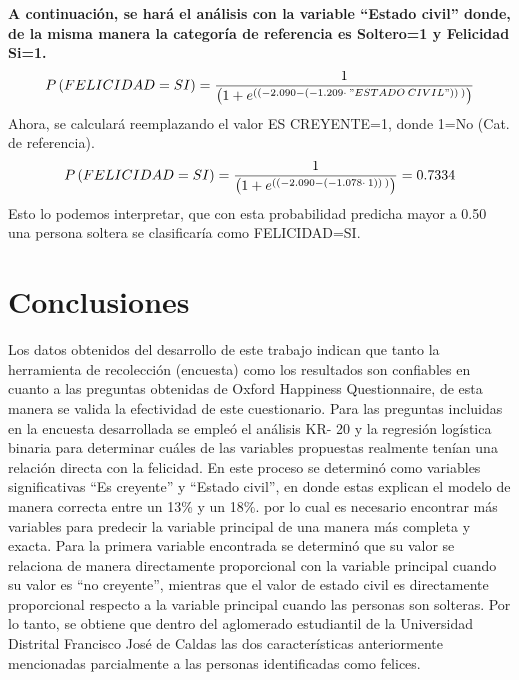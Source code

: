 \documentclass[conference]{IEEEtran}
\begin{document}
\textbf{A continuación, se hará el análisis con la variable “Estado civil” donde, de la misma manera la categoría de referencia es Soltero=1 y Felicidad Si=1.}\\   
\begin{equation}\tiny
P\left(FELICIDAD=SI\right)=\frac{1}{\left(1+e^{\left(\left(-2.090-\left(-1.209\cdot \:"ESTADO\:CIVIL"\right)\right)\:\right)}\right)}
\end{equation}
   Ahora, se calculará reemplazando el valor ES CREYENTE=1, donde 1=No (Cat. de referencia). \\
   \begin{equation}\tiny
 P\left(FELICIDAD=SI\right)=\frac{1}{\left(1+e^{\left(\left(-2.090-\left(-1.078\cdot \:1\right)\right)\:\right)}\right)}=0.7334
 \end{equation}
 Esto lo podemos interpretar, que con esta probabilidad predicha mayor a 0.50 una persona soltera se clasificaría como FELICIDAD=SI.\\
\section{Conclusiones}
  
  Los datos obtenidos del desarrollo de este trabajo   indican que tanto la herramienta de recolección (encuesta) como los resultados son confiables en cuanto a las preguntas obtenidas de Oxford Happiness Questionnaire, de esta manera se valida la efectividad de este cuestionario. Para las preguntas incluidas en la encuesta desarrollada se empleó el análisis KR- 20 y la regresión logística binaria para determinar cuáles de las variables propuestas realmente tenían una relación directa con la felicidad. En este proceso se determinó como variables significativas “Es creyente” y “Estado civil”, en donde estas explican el modelo de manera correcta entre un 13\% y un 18\%. por lo cual es necesario encontrar más variables para predecir la variable principal de una manera más completa y exacta. Para la primera variable encontrada se determinó que su valor se relaciona de manera directamente proporcional con la variable principal cuando su valor es “no creyente”, mientras que el valor de estado civil es directamente proporcional respecto a la variable principal cuando las personas son solteras. Por lo tanto, se obtiene que dentro del aglomerado estudiantil de la Universidad Distrital Francisco José de Caldas las dos características anteriormente mencionadas parcialmente a las personas identificadas como felices.\\\
 
\end{document}
